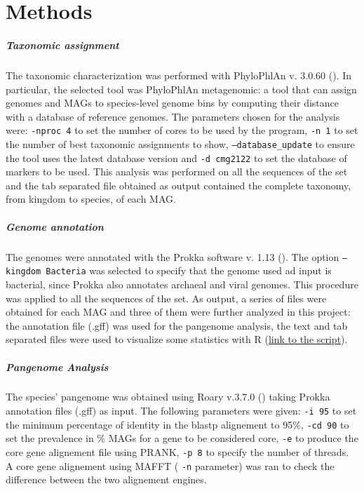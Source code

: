 \section*{Methods}




\nocite{Tange2011a}

\subparagraph*{Taxonomic assignment}

The taxonomic characterization was performed with PhyloPhlAn v. 3.0.60 (\cite{phylophlan}). In particular, the selected tool was PhyloPhlAn metagenomic: a tool that can assign genomes and MAGs to species-level genome bins by computing their distance with a database of reference genomes. The parameters chosen for the analysis were: \texttt{-nproc 4} to set the number of cores to be used by the program, \texttt{-n 1} to set the number of best taxonomic assignments to show, \texttt{--database\_update} to ensure the tool uses the latest database version and \texttt{-d cmg2122} to set the database of markers to be used. This analysis was performed on all the sequences of the set and the tab separated file obtained as output contained the complete taxonomy, from kingdom to species, of each MAG.

\subparagraph*{Genome annotation}

The genomes were annotated with the Prokka software v. 1.13 (\cite{prokka}). The option \texttt{--kingdom Bacteria} was selected to specify that the genome used ad input is bacterial, since Prokka also annotates archaeal and viral genomes. This procedure was applied to all the sequences of the set. As output, a series of files were obtained for each MAG and three of them were further analyzed in this project: the annotation file (.gff) was used for the pangenome analysis, the text and tab separated files were used to visualize some statistics with R (\href{https://github.com/enricofrigoli/cmg_project/blob/main/Rscript/CMG_Rscript.md}{link to the script}).



\subparagraph*{Pangenome Analysis}

The species' pangenome was obtained using Roary v.3.7.0 (\cite{Roary}) taking Prokka annotation files (.gff) as input. 
The following parameters were given: \texttt{-i 95} to set the minimum percentage of identity
in the blastp alignement to 95\%, \texttt{-cd 90} to set the prevalence in \% MAGs for a gene
to be considered core, \texttt{-e} to produce the core gene alignement file using PRANK, \texttt{-p 8} to
specify the number of threads. A core gene alignement using MAFFT ( \texttt{-n} parameter) was ran to check
the difference between the two alignement engines.


